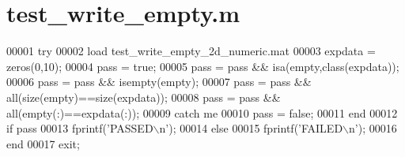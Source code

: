 \hypertarget{test__write__empty_8m_source}{}\section{test\+\_\+write\+\_\+empty.\+m}
\label{test__write__empty_8m_source}

\begin{DoxyCode}
00001 \textcolor{keywordflow}{try}
00002     load test\_write\_empty\_2d\_numeric.mat
00003     expdata = zeros(0,10);
00004     pass = \textcolor{keyword}{true};
00005     pass = pass && isa(empty,\textcolor{keyword}{class}(expdata));
00006     pass = pass && isempty(empty);
00007     pass = pass && all(size(empty)==size(expdata));
00008     pass = pass && all(empty(:)==expdata(:));
00009 \textcolor{keywordflow}{catch} me
00010     pass = \textcolor{keyword}{false};
00011 end
00012 \textcolor{keywordflow}{if} pass
00013     fprintf(\textcolor{stringliteral}{'PASSED\(\backslash\)n'});
00014 \textcolor{keywordflow}{else}
00015     fprintf(\textcolor{stringliteral}{'FAILED\(\backslash\)n'});
00016 end
00017 exit;
\end{DoxyCode}
